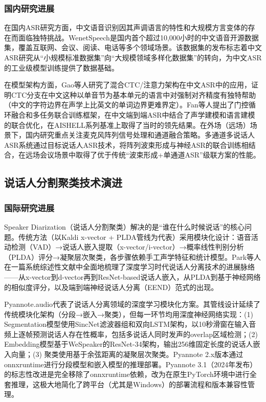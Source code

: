 \documentclass[12pt, a4paper]{article}
\begin{document}
\subsubsection{国内研究进展}

在国内ASR研究方面，中文语音识别因其声调语言的特性和大规模方言变体的存在而面临独特挑战。WenetSpeech\cite{zhang2022wenetspeech}是国内首个超过10,000小时的中文语音开源数据集，覆盖互联网、会议、阅读、电话等多个领域场景。该数据集的发布标志着中文ASR研究从``小规模标准数据集''向``大规模领域多样化数据集''的转向，为中文ASR的工业级模型训练提供了数据基础。

在模型架构方面，Gao等人\cite{gao2022improving}研究了混合CTC/注意力架构在中文ASR中的应用，证明CTC分支在中文这种以单音节为基本单元的语言中对强制对齐精度有独特帮助（中文的字符边界在声学上比英文的单词边界更难界定）。Fan等人\cite{fan2021cn}提出了门控循环融合和多任务联合训练框架，在中文端到端ASR中结合了声学建模和语言建模的联合优化，在AISHELL系列基准上取得了当时的领先结果。在外场（远场）场景下，国内研究重点关注麦克风阵列信号处理和通道融合策略。多通道多说话人ASR系统\cite{xiao2022multi}通过目标说话人ASR技术，将阵列波束形成与神经ASR的联合训练相结合，在远场会议场景中取得了优于传统``波束形成+单通道ASR''级联方案的性能。

\subsection{说话人分割聚类技术演进}

\subsubsection{国际研究进展}

Speaker Diarization（说话人分割聚类）解决的是``谁在什么时候说话''的核心问题。传统方法（以Kaldi x-vector + PLDA管线为代表）采用模块化设计：语音活动检测（VAD）→说话人嵌入提取（x-vector/i-vector）→概率线性判别分析（PLDA）评分→凝聚层次聚类，各步骤依赖手工声学特征和统计模型。Park等人\cite{park2022diarization}在一篇系统综述性文献中全面地梳理了深度学习时代说话人分离技术的进展脉络——从x-vector到d-vector再到ResNet-based说话人嵌入，从PLDA到基于神经网络的相似度评分，以及端到端神经说话人分离（EEND）范式的出现。

Pyannote.audio\cite{bredin2023pyannote,bredin2024pyannote31}代表了说话人分离领域的深度学习模块化方案。其管线设计延续了传统模块化架构（分段→嵌入→聚类），但每一环节均用深度神经网络实现：(1) Segmentation模型使用SincNet滤波器组和双向LSTM架构，以10秒滑窗在输入音频上逐帧预测说话人存在性概率，包括多说话人同时发声的overlap区域检测；(2) Embedding模型基于WeSpeaker\cite{wang2023wespeaker}的ResNet-34架构，输出256维固定长度的说话人嵌入向量；(3) 聚类使用基于余弦距离的凝聚层次聚类。Pyannote 2.x版本通过onnxruntime进行分段模型和嵌入模型的推理部署。Pyannote 3.1（2024年发布）的标志性改进是完全移除了onnxruntime依赖，改为在原生PyTorch环境中进行全套推理，这极大地简化了跨平台（尤其是Windows）的部署流程和版本兼容性管理。
\end{document}
